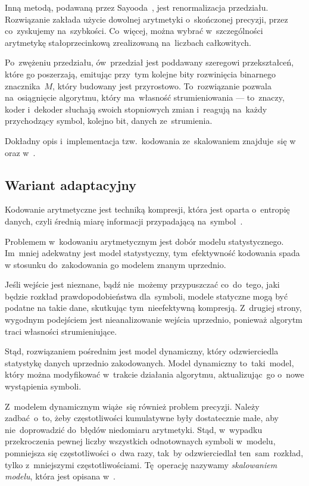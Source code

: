 \documentclass[../../praca.tex]{subfiles}
\begin{document}
Inną metodą, podawaną przez Sayooda~\cite{Sayood:IDC}, jest renormalizacja przedziału.
Rozwiązanie zakłada użycie dowolnej arytmetyki o~skończonej precyzji, przez 
co~zyskujemy na~szybkości. Co~więcej, można wybrać w~szczególności arytmetykę stałoprzecinkową zrealizowaną 
na~liczbach całkowitych. 

Po~zwężeniu przedziału, ów~przedział jest poddawany
szeregowi przekształceń, które go poszerzają, emitując przy~tym kolejne bity
rozwinięcia binarnego znacznika~\( M \), który budowany jest przyrostowo.
To~rozwiązanie pozwala na~osiągnięcie algorytmu, który ma~własność strumieniowania
--- to~znaczy, koder i~dekoder słuchają swoich stopniowych zmian i~reagują na~każdy
przychodzący symbol, kolejno bit, danych ze~strumienia. 

Dokładny opis i~implementacja tzw.~kodowania ze~skalowaniem znajduje~się 
w~\cite{Sayood:IDC} oraz w~\cite{Witten:AC}.

\subsection{Wariant adaptacyjny}

Kodowanie arytmetyczne jest techniką kompresji, która jest oparta o~entropię danych,
czyli średnią miarę informacji przypadającą na~symbol~\cite{Sayood:IDC}. 

Problemem w~kodowaniu arytmetycznym jest dobór modelu statystycznego. 
Im~mniej adekwatny jest model statystyczny, tym~efektywność kodowania
spada w stosunku do~zakodowania go modelem znanym uprzednio. 

Jeśli wejście jest nieznane, bądź nie~możemy przypuszczać co~do~tego, jaki
będzie rozkład prawdopodobieństwa dla~symboli, modele statyczne
mogą być podatne na takie dane, skutkując tym~nieefektywną kompresją.
Z~drugiej strony, wygodnym podejściem jest nieanalizowanie wejścia uprzednio, ponieważ
algorytm traci własności strumieniujące.

Stąd, rozwiązaniem pośrednim jest model dynamiczny, który odzwierciedla 
statystykę danych uprzednio zakodowanych. Model dynamiczny to~taki~model,
który można modyfikować w~trakcie działania algorytmu, aktualizując~go
o~nowe wystąpienia symboli. 

Z~modelem dynamicznym wiąże~się również problem precyzji. Należy zadbać~o~to, 
żeby częstotliwości kumulatywne były dostatecznie małe, aby
nie~doprowadzić do~błędów niedomiaru arytmetyki. Stąd, w~wypadku
przekroczenia pewnej liczby wszystkich odnotownaych symboli w~modelu,
pomniejsza się częstotliwości o~dwa razy, tak~by odzwierciedlał 
ten~sam~rozkład, tylko z~mniejszymi częstotliwościami. Tę~operację
nazywamy \emph{skalowaniem modelu}, która jest opisana w~\cite{Witten:AC}.
\end{document}
